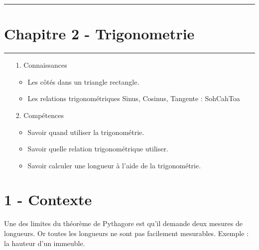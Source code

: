 \documentclass[12pt]{article}
\newcommand{\horrule}[1]{\rule{\linewidth}{#1}} %
\begin{document}

\newtheorem{Definition}{Définition}
\newtheorem{Theorem}{Théorème}
\newtheorem{Proposition}{Propriété}

\renewcommand{\labelitemi}{$\bullet$}
\renewcommand{\labelitemii}{$\circ$}

\setlength{\columnseprule}{1pt}

\horrule{2px}
\section*{Chapitre 2 - Trigonometrie}
\horrule{2px}

\begin{enumerate}
	\item[1.] Connaissances
	      \begin{itemize}
		  	  \item Les côtés dans un triangle rectangle. 
		      \item Les relations trigonométriques Sinus, Cosinus, Tangente : SohCahToa
	      \end{itemize}
	\item[2.] Compétences
	      \begin{itemize}
		      \item Savoir quand utiliser la trigonométrie.
			  \item Savoir quelle relation trigonométrique utiliser.
		      \item Savoir calculer une longueur à l'aide de la trigonométrie.
	      \end{itemize}
\end{enumerate}

\section*{1 - Contexte}
 
Une des limites du théorème de Pythagore est qu'il demande deux mesures de longueurs. Or toutes les longueurs ne sont pas facilement mesurables. Exemple : la hauteur d'un immeuble. 
\end{document}
